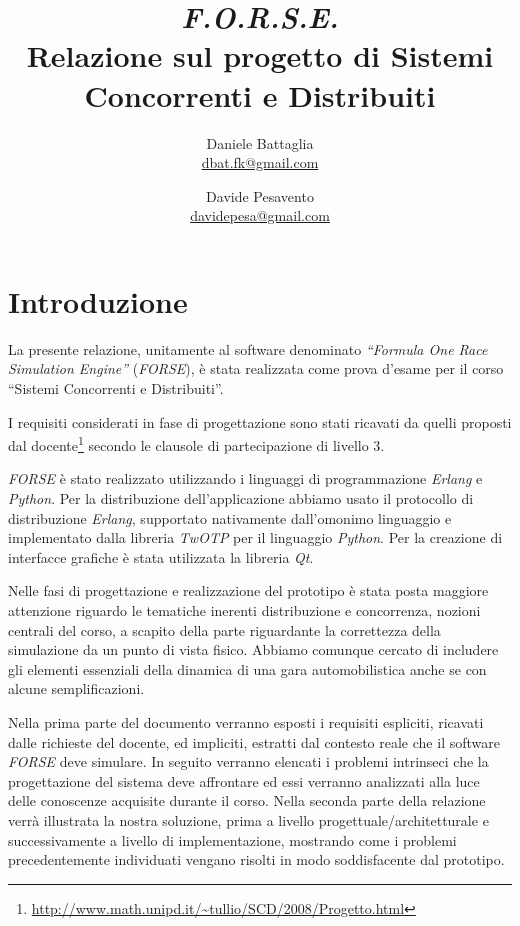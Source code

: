 \documentclass[a4paper]{report}
\title{{\huge \textsl{F.O.R.S.E.}}\\
	{\large Relazione sul progetto di Sistemi Concorrenti e Distribuiti}}
\author{Daniele Battaglia\\\url{dbat.fk@gmail.com}
	\and Davide Pesavento\\\url{davidepesa@gmail.com}}
\newcommand{\Erlang}{\textsl{Erlang}}
\newcommand{\Python}{\textsl{Python}}
\begin{document}
\maketitle

\tableofcontents

\clearpage


\chapter{Introduzione}
La presente relazione, unitamente al software denominato \textsl{``Formula One Race Simulation Engine''} (\textsl{FORSE}), è stata realizzata come prova d'esame per il corso ``Sistemi Concorrenti e Distribuiti''.

I requisiti considerati in fase di progettazione sono stati ricavati da quelli proposti dal docente\footnote{\url{http://www.math.unipd.it/~tullio/SCD/2008/Progetto.html}} secondo le clausole di partecipazione di livello 3.

\textsl{FORSE} è stato realizzato utilizzando i linguaggi di programmazione \Erlang{} e \Python{}. Per la distribuzione dell'applicazione abbiamo
usato il protocollo di distribuzione \Erlang{}, supportato nativamente dall'omonimo linguaggio e implementato dalla libreria \textsl{TwOTP} per il linguaggio
\Python{}.
Per la creazione di interfacce grafiche è stata utilizzata la libreria \textsl{Qt}.

Nelle fasi di progettazione e realizzazione del prototipo è stata posta maggiore attenzione riguardo le tematiche inerenti distribuzione e concorrenza, nozioni
centrali del corso, a scapito della parte riguardante la correttezza della simulazione da un punto di vista fisico. Abbiamo comunque cercato di includere
gli elementi essenziali della dinamica di una gara automobilistica anche se con alcune semplificazioni.

Nella prima parte del documento verranno esposti i requisiti espliciti, ricavati dalle richieste del docente, ed impliciti, estratti dal contesto reale che il software \textsl{FORSE} deve simulare.
In seguito verranno elencati i problemi intrinseci che la progettazione del sistema deve affrontare ed essi verranno analizzati alla luce delle conoscenze acquisite durante il corso.
Nella seconda parte della relazione verrà illustrata la nostra soluzione, prima a livello progettuale/architetturale e successivamente a livello di implementazione, mostrando come i problemi precedentemente individuati vengano risolti in modo soddisfacente dal prototipo.
\end{document}
